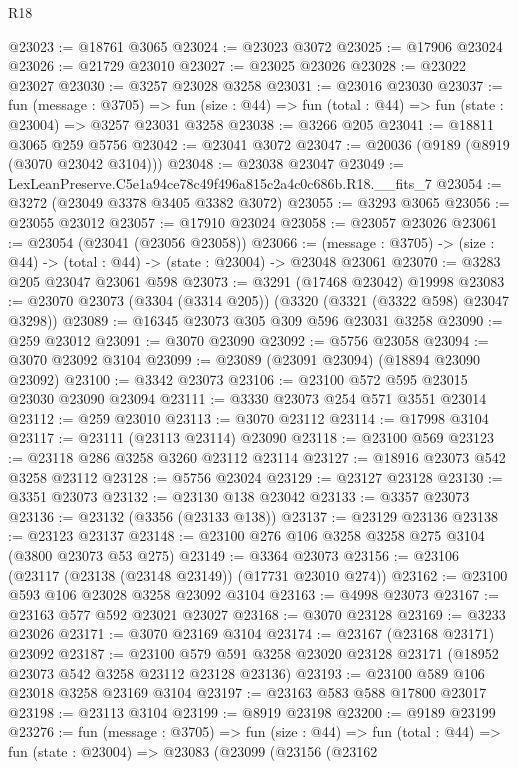 \begin{lexlean}{R18}
\begin{coremodule}
@23023 := @18761 @3065
@23024 := @23023 @3072
@23025 := @17906 @23024
@23026 := @21729 @23010
@23027 := @23025 @23026
@23028 := @23022 @23027
@23030 := @3257 @23028 @3258
@23031 := @23016 @23030
@23037 := fun (message : @3705) =>
  fun (size : @44) => fun (total : @44) => fun (state : @23004) => @3257 @23031 @3258
@23038 := @3266 @205
@23041 := @18811 @3065 @259 @5756
@23042 := @23041 @3072
@23047 := @20036 (@9189 (@8919 (@3070 @23042 @3104)))
@23048 := @23038 @23047
@23049 := LexLeanPreserve.C5e1a94ce78c49f496a815c2a4c0c686b.R18.__fits_7
@23054 := @3272 (@23049 @3378 @3405 @3382 @3072)
@23055 := @3293 @3065
@23056 := @23055 @23012
@23057 := @17910 @23024
@23058 := @23057 @23026
@23061 := @23054 (@23041 (@23056 @23058))
@23066 := (message : @3705) -> (size : @44) -> (total : @44) -> (state : @23004) -> @23048 @23061
@23070 := @3283 @205 @23047 @23061 @598
@23073 := @3291 (@17468 @23042) @19998
@23083 := @23070 @23073 (@3304 (@3314 @205)) (@3320 (@3321 (@3322 @598) @23047 @3298))
@23089 := @16345 @23073 @305 @309 @596 @23031 @3258
@23090 := @259 @23012
@23091 := @3070 @23090
@23092 := @5756 @23058
@23094 := @3070 @23092 @3104
@23099 := @23089 (@23091 @23094) (@18894 @23090 @23092)
@23100 := @3342 @23073
@23106 := @23100 @572 @595 @23015 @23030 @23090 @23094
@23111 := @3330 @23073 @254 @571 @3551 @23014
@23112 := @259 @23010
@23113 := @3070 @23112
@23114 := @17998 @3104
@23117 := @23111 (@23113 @23114) @23090
@23118 := @23100 @569
@23123 := @23118 @286 @3258 @3260 @23112 @23114
@23127 := @18916 @23073 @542 @3258 @23112
@23128 := @5756 @23024
@23129 := @23127 @23128
@23130 := @3351 @23073
@23132 := @23130 @138 @23042
@23133 := @3357 @23073
@23136 := @23132 (@3356 (@23133 @138))
@23137 := @23129 @23136
@23138 := @23123 @23137
@23148 := @23100 @276 @106 @3258 @3258 @275 @3104 (@3800 @23073 @53 @275)
@23149 := @3364 @23073
@23156 := @23106 (@23117 (@23138 (@23148 @23149)) (@17731 @23010 @274))
@23162 := @23100 @593 @106 @23028 @3258 @23092 @3104
@23163 := @4998 @23073
@23167 := @23163 @577 @592 @23021 @23027
@23168 := @3070 @23128
@23169 := @3233 @23026
@23171 := @3070 @23169 @3104
@23174 := @23167 (@23168 @23171) @23092
@23187 := @23100
    @579
    @591
    @3258
    @23020
    @23128
    @23171
    (@18952 @23073 @542 @3258 @23112 @23128 @23136)
@23193 := @23100 @589 @106 @23018 @3258 @23169 @3104
@23197 := @23163 @583 @588 @17800 @23017
@23198 := @23113 @3104
@23199 := @8919 @23198
@23200 := @9189 @23199
@23276 := fun (message : @3705) =>
  fun (size : @44) =>
  fun (total : @44) =>
  fun (state : @23004) =>
  @23083
    (@23099
      (@23156
        (@23162

\end{coremodule}
\end{lexlean}
